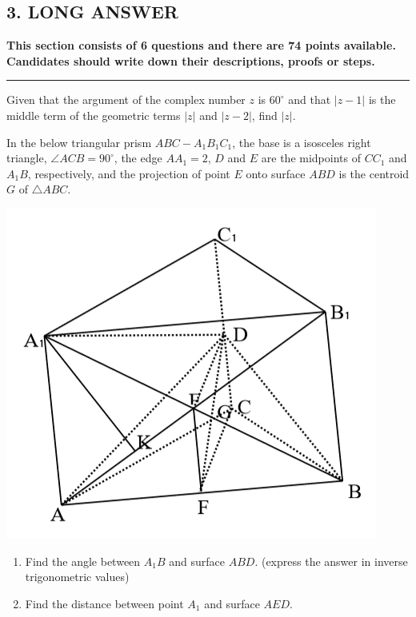 \documentclass[letterpaper,10pt,addpoints]{exam}
\begin{document}
\subsection*{3. LONG ANSWER}
\large{\textbf{This section consists of 6 questions and there are 74 points available. Candidates should write down their descriptions, proofs or steps.}\\}
\noindent \rule{\textwidth}{1pt}

\begin{questions}
\setcounter{question}{\mycounter2}

\question[12]
Given that the argument of the complex number $z$ is $60^{\circ}$ and that $|z-1|$ is the middle term of the geometric terms $|z|$ and $|z-2|$, find $|z|$.

\question[12]
In the below triangular prism $ABC-A_1B_1C_1$, the base is a isosceles right triangle, $\angle ACB=90^\circ$, the edge $AA_1=2$, $D$ and $E$ are the midpoints of $CC_1$ and $A_1B$, respectively, and the projection of point $E$ onto surface $ABD$ is the centroid $G$ of $\triangle ABC$.
\begin{center}
    \includegraphics[scale=0.7]{q18.png}
\end{center}
\renewcommand{\labelenumi}{(\Roman{enumi})}
\begin{enumerate}
    \item Find the angle between $A_1B$ and surface $ABD$. (express the answer in inverse trigonometric values)
    \item Find the distance between point $A_1$ and surface $AED$.
\end{enumerate}


\end{questions}
\end{document}
